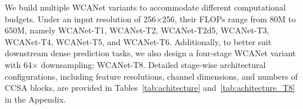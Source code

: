 \documentclass[a4paper,fleqn]{cas-dc}
\begin{document}
We build multiple WCANet variants to accommodate different computational budgets. Under an input resolution of 256×256, their FLOPs range from 80M to 650M, namely WCANet-T1, WCANet-T2, WCANet-T2d5, WCANet-T3, WCANet-T4, WCANet-T5, and WCANet-T6. Additionally, to better suit downstream dense prediction tasks, we also design a four-stage WCANet variant with 64× downsampling: WCANet-T8.
{\color{blue}
Detailed stage-wise architectural configurations, including feature resolutions,
channel dimensions, and numbers of CCSA blocks, are provided in
Tables~\ref{tab:achitecture} and~\ref{tab:achitecture_T8} in the Appendix.
}
\end{document}

